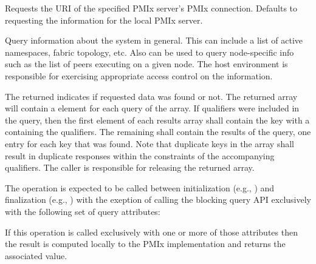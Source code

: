  Requests the URI of the specified \ac{PMIx} server's \ac{PMIx} connection. Defaults to requesting the information for the local \ac{PMIx} server.
\pasteAttributeItemEnd
{}

\descr

Query information about the system in general.
This can include a list of active namespaces, fabric topology, etc.
Also can be used to query node-specific info such as the list of peers executing on a given node. The host environment is responsible for exercising appropriate access control on the information.

The returned  indicates if requested data was found or not. The returned  array will contain a  element for each query of the  array. If qualifiers were included in the query, then the first element of each results array shall contain the  key with a  containing the qualifiers. The remaining  shall contain the results of the query, one entry for each key that was found. Note that duplicate keys in the  array shall result in duplicate responses within the constraints of the accompanying qualifiers. The caller is responsible for releasing the returned array.

The  operation is expected to be called between initialization (e.g., ) and finalization (e.g., ) with the exeption of calling the blocking query \ac{API} exclusively with the following set of query attributes:
\begin{compactitem}
\item {}
\item {}
\end{compactitem}
If this operation is called exclusively with one or more of those attributes then the result is computed locally to the \ac{PMIx} implementation and returns the associated value.

